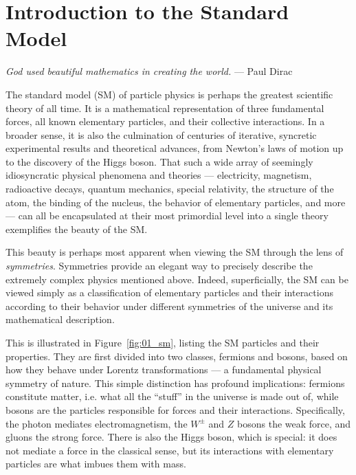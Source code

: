 
\chapter{Introduction to the Standard Model}
\label{sec:01_intro}

\begin{center}
	\centering
	\noindent
	\textit{God used beautiful mathematics in creating the world.} --- Paul Dirac~\cite{pagels2012cosmic}
\end{center}

\baselineskip

The standard model (SM) of particle physics is perhaps the greatest scientific theory of all time.
It is a mathematical representation of three fundamental forces, all known elementary particles, and their collective interactions.
In a broader sense, it is also the culmination of centuries of iterative, syncretic experimental results and theoretical advances, from Newton's laws of motion up to the discovery of the Higgs boson.
That such a wide array of seemingly idiosyncratic physical phenomena and theories --- electricity, magnetism, radioactive decays, quantum mechanics, special relativity, the structure of the atom, the binding of the nucleus, the behavior of elementary particles, and more --- can all be encapsulated at their most primordial level into a single theory exemplifies the beauty of the SM.

This beauty is perhaps most apparent when viewing the SM through the lens of \textit{symmetries}.
Symmetries provide an elegant way to precisely describe the extremely complex physics mentioned above.
Indeed, superficially, the SM can be viewed simply as a classification of elementary particles and their interactions according to their behavior under different symmetries of the universe and its mathematical description.

This is illustrated in Figure~\ref{fig:01_sm}, listing the SM particles and their properties.
They are first divided into two classes, fermions and bosons, based on how they behave under Lorentz transformations --- a fundamental physical symmetry of nature.
This simple distinction has profound implications: fermions constitute matter, i.e. what all the ``stuff'' in the universe is made out of, while bosons are the particles responsible for forces and their interactions.
Specifically, the photon mediates electromagnetism, the $W^{\pm}$ and $Z$ bosons the weak force, and gluons the strong force.
There is also the Higgs boson, which is special: it does not mediate a force in the classical sense, but its interactions with elementary particles are what imbues them with mass.

